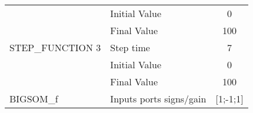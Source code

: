 \begin{enumerate}
\begin{table}
\begin{tabular}{llc}
                              & Initial Value              & 0         \\
                              & Final Value                & 100       \\ \hline
            STEP\_FUNCTION 3  & Step time                  & 7         \\
                              & Initial Value              & 0         \\
                              & Final Value                & 100       \\ \hline
            BIGSOM\_f         & Inputs ports signs/gain    & [1;-1;1]  \\ \hline
          \end{tabular}
        \end{table}
\end{enumerate}







